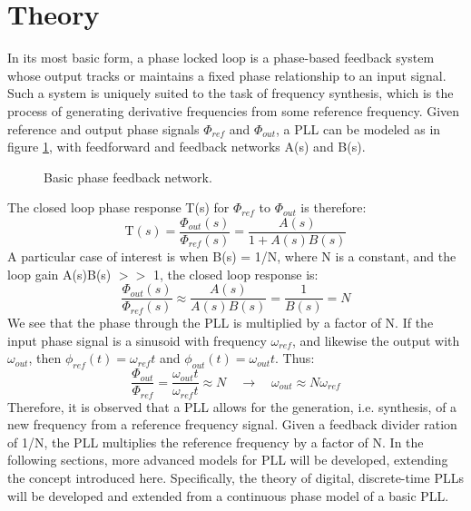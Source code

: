 \section{Theory}\label{theory}
	In its most basic form, a phase locked loop is a phase-based feedback system whose output tracks or maintains a fixed phase relationship to an input signal. Such a system is uniquely suited to the task of frequency synthesis, which is the process of generating derivative frequencies from some reference frequency. Given reference and output phase signals $\Phi_{ref}$ and $\Phi_{out}$, a PLL can be modeled as in figure \ref{fig:basic_fb}, with feedforward and feedback networks A(s) and B(s). 
	\begin{figure}[htb!]
		\center
		\caption{Basic phase feedback network.}
		\label{fig:basic_fb}
	\end{figure}
	\FloatBarrier
	The closed loop phase response T(s) for $\Phi_{ref}$ to $\Phi_{out}$ is therefore:
	\begin{equation}
		\mathrm{T}(s) = \frac{\Phi_{out}(s)}{\Phi_{ref}(s)} = \frac{A(s)}{1+A(s)B(s)}
	\end{equation}
	A particular case of interest is when B(s) = 1/N, where N is a constant, and the loop gain A(s)B(s) $>>$ 1, the closed loop response is:
	\begin{equation}\label{mult_by_n}
		\frac{\Phi_{out}(s)}{\Phi_{ref}(s)} \approx \frac{A(s)}{A(s)B(s)} = \frac{1}{B(s)} = N
	\end{equation}
	We see that the phase through the PLL is multiplied by a factor of N. If the input phase signal is a sinusoid with frequency $\omega_{ref}$, and likewise the output with $\omega_{out}$, then $\phi_{ref}(t)=\omega_{ref}t$ and $\phi_{out}(t)=\omega_{out}t$. Thus:
	\begin{equation}\label{mult_by_n}
		\frac{\Phi_{out}}{\Phi_{ref}} = \frac{\omega_{out}t}{\omega_{ref}t} \approx N \hspace{1em} \rightarrow \hspace{1em} \omega_{out} \approx N\omega_{ref}
	\end{equation}
	Therefore, it is observed that a PLL allows for the generation, i.e. synthesis, of a new frequency from a reference frequency signal. Given a feedback divider ration of 1/N, the PLL multiplies the reference frequency by a factor of N. In the following sections, more advanced models for PLL will be developed, extending the concept introduced here. Specifically, the theory of digital, discrete-time PLLs will be developed and extended from a continuous phase model of a basic PLL.

